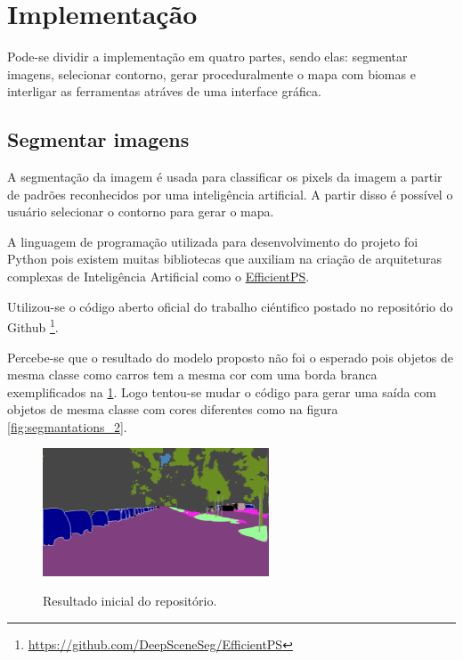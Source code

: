 \section{Implementação}

Pode-se dividir a implementação em quatro partes, sendo elas: segmentar imagens, selecionar contorno, gerar proceduralmente o mapa com biomas e interligar as ferramentas atráves de uma interface gráfica.

\subsection{Segmentar imagens}

A segmentação da imagem é usada para classificar os pixels da imagem a partir de padrões reconhecidos por uma inteligência artificial. A partir disso é possível o usuário selecionar o contorno para gerar o mapa.

A linguagem de programação utilizada para desenvolvimento do projeto foi Python pois existem muitas bibliotecas que auxiliam na criação de arquiteturas complexas de Inteligência Artificial como o \hyperref[sec:EfficientPS]{EfficientPS}.

Utilizou-se o código aberto oficial do trabalho ciéntifico postado no repositório do Github \footnote{\url{https://github.com/DeepSceneSeg/EfficientPS}}.

Percebe-se que o resultado do modelo proposto não foi o esperado pois objetos de mesma classe como carros tem a mesma cor com uma borda branca exemplificados na \cref{fig:resultado_inicial}. Logo tentou-se mudar o código para gerar uma saída com objetos de mesma classe com cores diferentes como na figura \cref{fig:segmantations_2}.

\begin{figure}[!ht]
	\centering
    \caption{Resultado inicial do repositório.}
	\includegraphics[width=0.6\textwidth]{figures/resultado_primario.png}
	\label{fig:resultado_inicial}
\end{figure}

